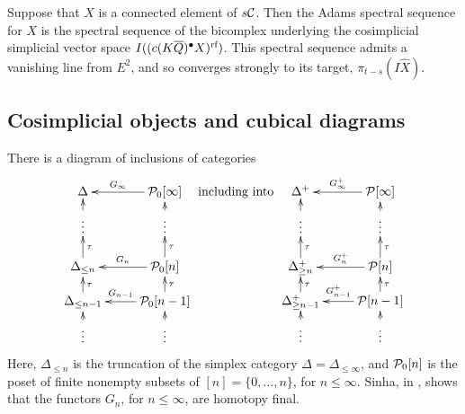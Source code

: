 \documentclass[10pt]{article}
\newcommand{\Comm}{\calC}
\newcommand{\PuncCube}[1]{\calP_{0}[#1]}
\newcommand{\FullCube}[1]{\calP[#1]}
\newcommand{\TruncSimplex}[1]{{\Delta_{\leq#1}}}
\newcommand{\TruncAugSimplex}[1]{{\Delta^{\smash{+}}_{\smash{\geq#1}}}}
\begin{document}
\begin{TotalisationInSAlg}
\begin{cor}
\end{cor}
\begin{cor}
Suppose that $X$ is a connected element of $s\Comm$. Then the Adams spectral sequence for $X$ is the spectral sequence of the bicomplex underlying the cosimplicial simplicial vector space $I((c(K\overline{Q})^\bullet X)^{\textup{rf}})$. This spectral sequence admits a vanishing line from $E^2$, and so converges strongly to its target, $\pi_{t-s}(I\hat X)$.
\end{cor}
\end{TotalisationInSAlg}

\begin{convergence}

\subsection{Cosimplicial objects and cubical diagrams}

There is a diagram of inclusions of categories
\[\xymatrix@R=4mm{
\Delta&%
\PuncCube{\infty}
\ar[l]_-{G_\infty}
\\%
{\vdots}
\ar[u]
&%
\vdots
\ar[u]
\\%
\TruncSimplex{n}
\ar[u]_-{\tau}
&%
\PuncCube{n}
\ar[u]_-{\tau}
\ar[l]_-{G_n}
\\%
\TruncSimplex{n-1}
\ar[u]_-{\tau}
&%
\PuncCube{n-1}
\ar[u]_-{\tau}
\ar[l]_-{G_{n-1}}
\\%
{\vdots}
\ar[u]
&%
\vdots
\ar[u]
}\textup{ including into }
\xymatrix@R=4mm{
\Delta^+&%
\FullCube{\infty}
\ar[l]_-{G_\infty^+}
\\%
{\vdots}
\ar[u]
&%
\vdots
\ar[u]
\\%
\TruncAugSimplex{n}
\ar[u]_-{\tau}
&%
\FullCube{n}
\ar[u]_-{\tau}
\ar[l]_-{G_n^+}
\\%
\TruncAugSimplex{n-1}
\ar[u]_-{\tau}
&%
\FullCube{n-1}
\ar[u]_-{\tau}
\ar[l]_-{G_{n-1}^+}
\\%
{\vdots}
\ar[u]
&%
\vdots
\ar[u]
}
\]
Here, $\TruncSimplex{n}$ is the truncation of the simplex category $\Delta=\TruncSimplex{\infty}$, and $\PuncCube{n}$ is the poset of finite nonempty subsets of $[n]=\{0,\ldots,n\}$, for $n\leq\infty$.
Sinha, in \cite{SinhaSpacesOfKnots.pdf}, shows that the functors $G_n$, for $n\leq\infty$, are homotopy final.


\end{convergence}
\end{document}
